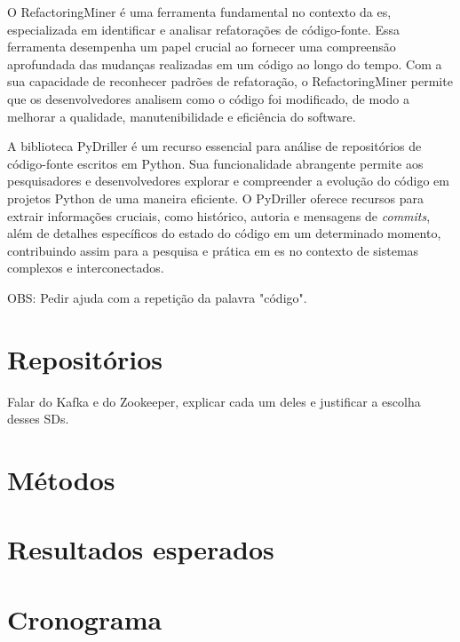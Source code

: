O RefactoringMiner \cite{Tsantalis:ICSE:2018:RefactoringMiner} é uma ferramenta fundamental no contexto da \gls{es}, especializada em identificar e analisar refatorações de código-fonte. Essa ferramenta desempenha um papel crucial ao fornecer uma compreensão aprofundada das mudanças realizadas em um código ao longo do tempo. Com a sua capacidade de reconhecer padrões de refatoração, o RefactoringMiner permite que os desenvolvedores analisem como o código foi modificado, de modo a melhorar a qualidade, manutenibilidade e eficiência do software.

A biblioteca PyDriller \cite{PyDrillerSpadini2018} é um recurso essencial para análise de repositórios de código-fonte escritos em Python. Sua funcionalidade abrangente permite aos pesquisadores e desenvolvedores explorar e compreender a evolução do código em projetos Python de uma maneira eficiente. O PyDriller oferece recursos para extrair informações cruciais, como histórico, autoria e mensagens de \textit{commits}, além de detalhes específicos do estado do código em um determinado momento, contribuindo assim para a pesquisa e prática em \gls{es} no contexto de sistemas complexos e interconectados.

OBS: Pedir ajuda com a repetição da palavra "código".

\section{Repositórios}\label{sec:repositorios}
Falar do Kafka e do Zookeeper, explicar cada um deles e justificar a escolha desses SDs.

\section{Métodos}\label{sec:metodo}

\section{Resultados esperados}


\section{Cronograma}